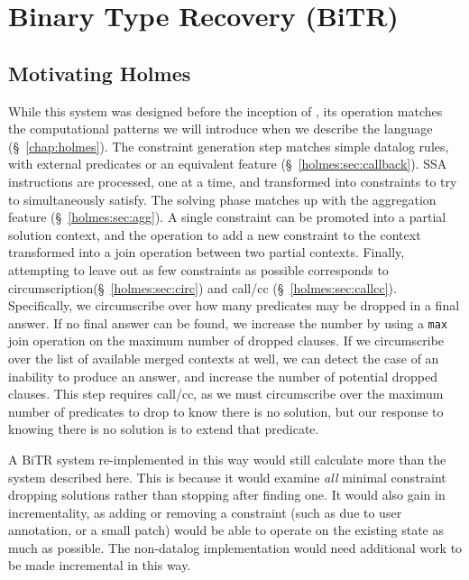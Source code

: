 
\newcommand{\bitr}{{\sc BiTR}}

\chapter{Binary Type Recovery (\bitr)}
\label{chap:bitr}






\section{Motivating Holmes}
While this system was designed before the inception of {\sysname}, its operation matches the computational patterns we will introduce when we describe the language (\S~\ref{chap:holmes}).
The constraint generation step matches simple datalog rules, with external predicates or an equivalent feature (\S~\ref{holmes:sec:callback}).
SSA instructions are processed, one at a time, and transformed into constraints to try to simultaneously satisfy.
The solving phase matches up with the aggregation feature (\S~\ref{holmes:sec:agg}).
A single constraint can be promoted into a partial solution context, and the operation to add a new constraint to the context transformed into a join operation between two partial contexts.
Finally, attempting to leave out as few constraints as possible corresponds to circumscription(\S~\ref{holmes:sec:circ}) and call/cc (\S~\ref{holmes:sec:callcc}).
Specifically, we circumscribe over how many predicates may be dropped in a final answer.
If no final answer can be found, we increase the number by using a \texttt{max} join operation on the maximum number of dropped clauses.
If we circumscribe over the list of available merged contexts at well, we can detect the case of an inability to produce an answer, and increase the number of potential dropped clauses.
This step requires call/cc, as we must circumscribe over the maximum number of predicates to drop to know there is no solution, but our response to knowing there is no solution is to extend that predicate.

A {\bitr} system re-implemented in this way would still calculate more than the system described here.
This is because it would examine \emph{all} minimal constraint dropping solutions rather than stopping after finding one.
It would also gain in incrementality, as adding or removing a constraint (such as due to user annotation, or a small patch) would be able to operate on the existing state as much as possible.
The non-datalog implementation would need additional work to be made incremental in this way.

